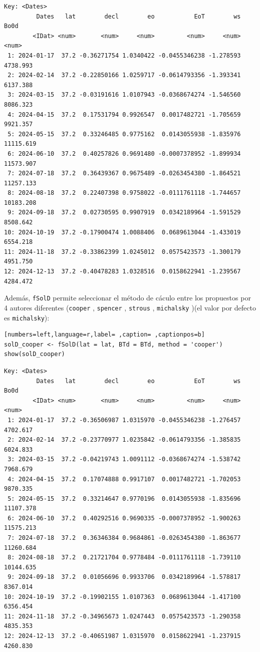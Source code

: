 \begin{verbatim}
Key: <Dates>
         Dates   lat        decl        eo           EoT        ws      Bo0d
        <IDat> <num>       <num>     <num>         <num>     <num>     <num>
 1: 2024-01-17  37.2 -0.36271754 1.0340422 -0.0455346238 -1.278593  4738.993
 2: 2024-02-14  37.2 -0.22850166 1.0259717 -0.0614793356 -1.393341  6137.388
 3: 2024-03-15  37.2 -0.03191616 1.0107943 -0.0368674274 -1.546560  8086.323
 4: 2024-04-15  37.2  0.17531794 0.9926547  0.0017482721 -1.705659  9921.357
 5: 2024-05-15  37.2  0.33246485 0.9775162  0.0143055938 -1.835976 11115.619
 6: 2024-06-10  37.2  0.40257826 0.9691480 -0.0007378952 -1.899934 11573.907
 7: 2024-07-18  37.2  0.36439367 0.9675489 -0.0263454380 -1.864521 11257.133
 8: 2024-08-18  37.2  0.22407398 0.9758022 -0.0111761118 -1.744657 10183.208
 9: 2024-09-18  37.2  0.02730595 0.9907919  0.0342189964 -1.591529  8508.642
10: 2024-10-19  37.2 -0.17900474 1.0088406  0.0689613044 -1.433019  6554.218
11: 2024-11-18  37.2 -0.33862399 1.0245012  0.0575423573 -1.300179  4951.750
12: 2024-12-13  37.2 -0.40478283 1.0328516  0.0158622941 -1.239567  4284.472
\end{verbatim}

Además, \texttt{fSolD} permite seleccionar el método de cáculo entre los propuestos por 4 autores diferentes (\texttt{cooper} \cite{Cooper1969}, \texttt{spencer} \cite{Spencer1971}, \texttt{strous} \cite{Strous2011}, \texttt{michalsky} \cite{Michalsky1988})(el valor por defecto es \texttt{michalsky}):
\begin{lstlisting}[numbers=left,language=r,label= ,caption= ,captionpos=b]
solD_cooper <- fSolD(lat = lat, BTd = BTd, method = 'cooper')
show(solD_cooper)
\end{lstlisting}

\begin{verbatim}
Key: <Dates>
         Dates   lat        decl        eo           EoT        ws      Bo0d
        <IDat> <num>       <num>     <num>         <num>     <num>     <num>
 1: 2024-01-17  37.2 -0.36506987 1.0315970 -0.0455346238 -1.276457  4702.617
 2: 2024-02-14  37.2 -0.23770977 1.0235842 -0.0614793356 -1.385835  6024.833
 3: 2024-03-15  37.2 -0.04219743 1.0091112 -0.0368674274 -1.538742  7968.679
 4: 2024-04-15  37.2  0.17074888 0.9917107  0.0017482721 -1.702053  9870.335
 5: 2024-05-15  37.2  0.33214647 0.9770196  0.0143055938 -1.835696 11107.378
 6: 2024-06-10  37.2  0.40292516 0.9690335 -0.0007378952 -1.900263 11575.213
 7: 2024-07-18  37.2  0.36346384 0.9684861 -0.0263454380 -1.863677 11260.684
 8: 2024-08-18  37.2  0.21721704 0.9778484 -0.0111761118 -1.739110 10144.635
 9: 2024-09-18  37.2  0.01056696 0.9933706  0.0342189964 -1.578817  8367.014
10: 2024-10-19  37.2 -0.19902155 1.0107363  0.0689613044 -1.417100  6356.454
11: 2024-11-18  37.2 -0.34965673 1.0247443  0.0575423573 -1.290358  4835.353
12: 2024-12-13  37.2 -0.40651987 1.0315970  0.0158622941 -1.237915  4260.830
\end{verbatim}

